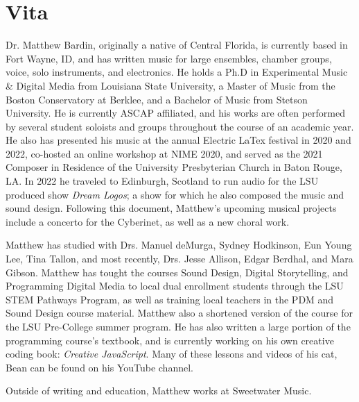 \chapter{Vita}

Dr. Matthew Bardin, originally a native of Central Florida, is currently based in Fort Wayne, ID, and has written music for large ensembles, chamber groups, voice, solo instruments, and electronics. He holds a Ph.D in Experimental Music \& Digital Media from Louisiana State University, a Master of Music from the Boston Conservatory at Berklee, and a  Bachelor of Music from Stetson University. He is currently ASCAP affiliated, and his works are often performed by several student soloists and groups throughout the course of an academic year. He also has presented his music at the annual Electric LaTex festival in 2020 and 2022, co-hosted an online workshop at NIME 2020, and served as the 2021 Composer in Residence of the University Presbyterian Church in Baton Rouge, LA. In 2022 he traveled to Edinburgh, Scotland to run audio for the LSU produced show \textit{Dream Logos}; a show for which he also composed the music and sound design. Following this document, Matthew's upcoming musical projects include a concerto for the Cyberinet, as well as a new choral work.

Matthew has studied with Drs. Manuel deMurga, Sydney Hodkinson, Eun Young Lee, Tina Tallon, and most recently, Drs. Jesse Allison, Edgar Berdhal, and Mara Gibson. Matthew has tought the courses Sound Design, Digital Storytelling, and Programming Digital Media to local dual enrollment students through the LSU STEM Pathways Program, as well as training local teachers in the PDM and Sound Design course material. Matthew also a shortened version of the course for the LSU Pre-College summer program. He has also written a large portion of the programming course's textbook, and is currently working on his own creative coding book: \textit{Creative JavaScript}. Many of these lessons and videos of his cat, Bean can be found on his YouTube channel.

Outside of writing and education, Matthew works at Sweetwater Music. %


